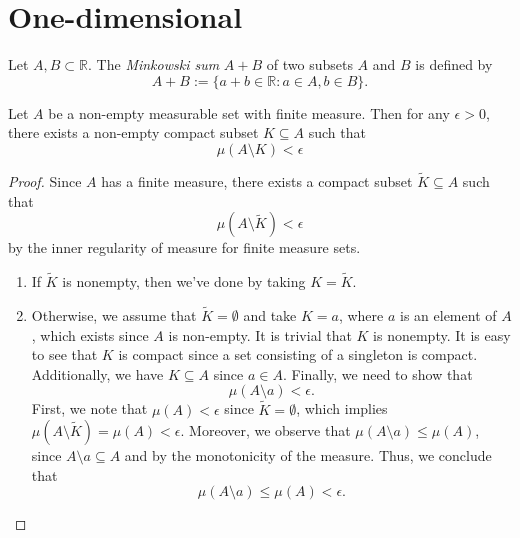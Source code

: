 \section{One-dimensional}

\begin{definition}
    Let \(A, B \subset \mathbb{R}\). The \textit{Minkowski sum} \(A+B\) of two subsets \(A\) and \(B\) is defined by
    \begin{equation*}
        A+B:= \{a+b\in\mathbb{R} : a \in A, b \in B\}.
    \end{equation*}
\end{definition}

\begin{lemma}
    Let \(A\) be a non-empty measurable set with finite measure. 
    Then for any \(\epsilon > 0\), there exists a non-empty compact subset \(K \subseteq A\) such that 
    \begin{equation*}
        \mu(A \setminus K) < \epsilon
    \end{equation*}
    \label{lemma: exists_isCompact_Nonempty_diff_lt}
\end{lemma}

\begin{proof}
    Since \(A\) has a finite measure, there exists a compact subset \(\widetilde{K} \subseteq A\) such that 
    \begin{equation*}
        \mu (A \setminus \widetilde{K}) < \epsilon
    \end{equation*}
    by the inner regularity of measure for finite measure sets.
    \begin{enumerate}
        \item If \(\widetilde{K}\) is nonempty, then we've done by taking \(K = \widetilde{K}\).
        \item Otherwise, we assume that \(\widetilde{K} = \emptyset\) and take \(K = {a}\), where \(a\) is an element of \(A\), which exists since \(A\) is non-empty. 
        It is trivial that \(K\) is nonempty. It is easy to see that \(K\) is compact since a set consisting of a singleton is compact.
        Additionally, we have \(K \subseteq A\) since \(a \in A\). Finally, we need to show that 
        \begin{equation*}
            \mu(A \setminus {a}) < \epsilon.
        \end{equation*}
        First, we note that \(\mu(A)<\epsilon\) since \(\widetilde{K} = \emptyset\), which implies \(\mu(A\setminus \widetilde{K}) = \mu(A) < \epsilon\).
        Moreover, we observe that \(\mu(A \setminus {a}) \leq \mu(A)\), since \(A\setminus {a} \subseteq A\) and by the monotonicity of the measure. 
        Thus, we conclude that
        \begin{equation*}
            \mu (A \setminus {a}) \leq \mu(A) < \epsilon.
        \end{equation*}
    \end{enumerate}
\end{proof}

